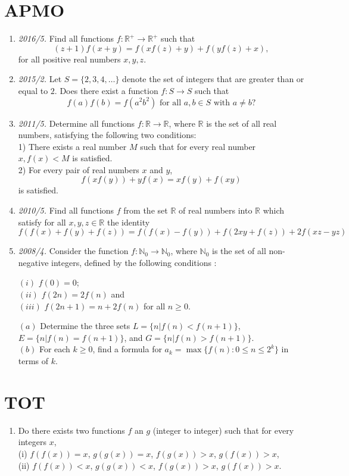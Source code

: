 \documentclass[11pt,a4paper]{article}
\begin{document}
\section{APMO}
\begin{enumerate}
\item\emph{2016/5.} Find all functions $f: \mathbb{R}^+ \to \mathbb{R}^+$ such that
$$(z + 1)f(x + y) = f(xf(z) + y) + f(yf(z) + x),$$for all positive real numbers $x, y, z$.

\item\emph{2015/2.} Let $S = \{2, 3, 4, \ldots\}$ denote the set of integers that are greater than or equal to $2$. Does there exist a function $f : S \to S$ such that \[f (a)f (b) = f (a^2 b^2 )\text{ for all }a, b \in S\text{ with }a \ne b?\]

\item\emph{2011/5.} Determine all functions $f:\mathbb{R}\to\mathbb{R}$, where $\mathbb{R}$ is the set of all real numbers, satisfying the following two conditions:\\
1) There exists a real number $M$ such that for every real number $x,f(x)<M$ is satisfied.\\
2) For every pair of real numbers $x$ and $y$,
\[ f(xf(y))+yf(x)=xf(y)+f(xy)\]
is satisfied.

\item\emph{2010/5.} Find all functions $f$ from the set $\mathbb{R}$ of real numbers into $\mathbb{R}$ which satisfy for all $x, y, z \in \mathbb{R}$ the identity $f(f(x)+f(y)+f(z))=f(f(x)-f(y))+f(2xy+f(z))+2f(xz-yz)$

\item\emph{2008/4.} Consider the function $ f: \mathbb{N}_0\to\mathbb{N}_0$, where $ \mathbb{N}_0$ is the set of all non-negative
integers, defined by the following conditions :

$ (i)$ $ f(0) = 0$;\\ $ (ii)$ $ f(2n) = 2f(n)$ and \\$ (iii)$ $ f(2n + 1) = n + 2f(n)$ for all $ n\geq 0$.

$ (a)$ Determine the three sets $ L = \{ n | f(n) < f(n + 1) \}$, $ E = \{n | f(n) = f(n + 1) \}$, and $ G = \{n | f(n) > f(n + 1) \}$.\\
$ (b)$ For each $ k \geq 0$, find a formula for $ a_k = \max\{f(n) : 0 \leq n \leq 2^k\}$ in terms of $ k$.

\end{enumerate}

\section{TOT}
\begin{enumerate}
\item Do there exists two functions $f$ an $g$ (integer to integer) such that for every integers $x$,\\
(i) $f(f(x))=x$, $g(g(x))=x$, $f(g(x))>x$, $g(f(x))>x$,\\
(ii) $f(f(x))<x$, $g(g(x))<x$, $f(g(x))>x$, $g(f(x))>x.$
\end{enumerate}
\end{document}
